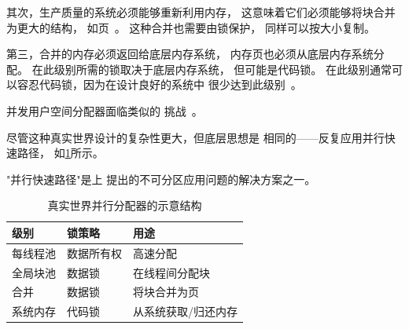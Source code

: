 其次，生产质量的系统必须能够重新利用内存，
这意味着它们必须能够将块合并为更大的结构，
如页~\cite{McKenney93}。
这种合并也需要由锁保护，
同样可以按大小复制。

第三，合并的内存必须返回给底层内存系统，
内存页也必须从底层内存系统分配。
在此级别所需的锁取决于底层内存系统，
但可能是代码锁。
在此级别通常可以容忍代码锁，因为在设计良好的系统中
很少达到此级别~\cite{McKenney01e}。

并发用户空间分配器面临类似的
挑战~\cite{ChrisKennelly2020tcmalloc,JasonEvans2011jemalloc}。

尽管这种真实世界设计的复杂性更大，但底层思想是
相同的——反复应用并行快速路径，
如\cref{fig:app:questions:Schematic of Real-World Parallel Allocator}所示。

"并行快速路径"是上
提出的不可分区应用问题的解决方案之一。

\begin{table}
\small
\centering
\renewcommand*{\arraystretch}{1.25}
\begin{tabularx}{\twocolumnwidth}{ll>{\raggedright\arraybackslash}X}
\toprule
级别	& 锁策略 & 用途 \\
\midrule
每线程池	  & 数据所有权 & 高速分配 \\
全局块池 & 数据锁   & 在线程间分配块 \\
合并	  & 数据锁   & 将块合并为页 \\
系统内存	  & 代码锁   & 从系统获取/归还内存 \\
\bottomrule
\end{tabularx}
\caption{真实世界并行分配器的示意结构}
\label{fig:app:questions:Schematic of Real-World Parallel Allocator}
\end{table}



